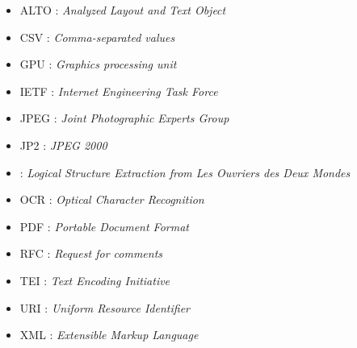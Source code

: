 \begin{itemize}
    \item ALTO : \textit{Analyzed Layout and Text Object}
    \item CSV : \textit{Comma-separated values}
    \item GPU : \textit{Graphics processing unit}
    \item IETF : \textit{Internet Engineering Task Force}
    \item JPEG : \textit{Joint Photographic Experts Group}
    \item JP2 : \textit{JPEG 2000}
    \item \lse{} : \textit{Logical Structure Extraction from Les Ouvriers des Deux Mondes}
    \item OCR : \textit{Optical Character Recognition}
    \item PDF : \textit{Portable Document Format}
    \item RFC : \textit{Request for comments}
    \item TEI : \textit{Text Encoding Initiative}
    \item URI : \textit{Uniform Resource Identifier}
    \item XML : \textit{Extensible Markup Language}
\end{itemize}

\clearpage
\thispagestyle{empty}